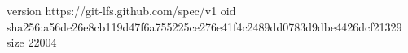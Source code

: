 version https://git-lfs.github.com/spec/v1
oid sha256:a56de26e8cb119d47f6a755225ce276e41f4c2489dd0783d9dbe4426dcf21329
size 22004
